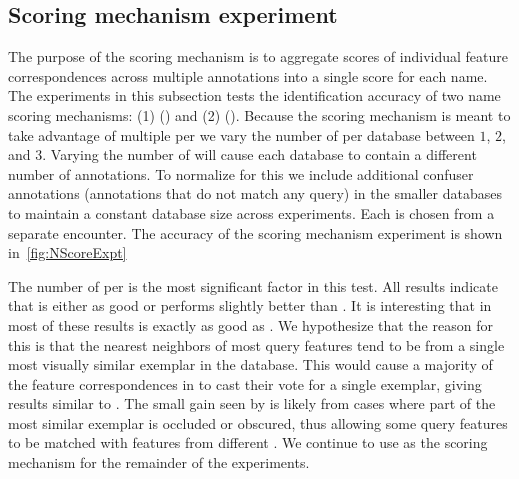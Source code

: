         \kptstype{}

    \subsection{Scoring mechanism experiment}\label{sub:exptscoremech}  


        The purpose of the scoring mechanism is to aggregate scores of individual feature correspondences across
          multiple annotations into a single score for each name.
        The experiments in this subsection tests the identification accuracy of two name scoring mechanisms:
        (1) \cscoring{} (\csum{}) and
        (2) \nscoring{} (\nsum{}).
        Because the scoring mechanism is meant to take advantage of multiple \exemplars{} per \name{} we vary the
          number of \exemplars{} per database \name{} between $1$, $2$, and $3$.
        Varying the number of \exemplars{} will cause each database to contain a different number of annotations.
        To normalize for this we include additional confuser annotations (annotations that do not match any
          query) in the smaller databases to maintain a constant database size across experiments.
        Each \exemplar{} is chosen from a separate encounter.
        The accuracy of the scoring mechanism experiment is shown in~\cref{fig:NScoreExpt}

        \NScoreExpt{}

        The number of \exemplars{} per \name{} is the most significant factor in this test.
        All results indicate that \nsum{} is either as good or performs slightly better than \csum{}.
        It is interesting that in most of these results \nsum{} is exactly as good as \csum{}.
        We hypothesize that the reason for this is that the nearest neighbors of most query features tend to be
          from a single most visually similar exemplar in the database.
        This would cause a majority of the feature correspondences in \nsum{} to cast their vote for a single
          exemplar, giving results similar to \csum{}.
        The small gain seen by \nsum{} is likely from cases where part of the most similar exemplar is occluded
          or obscured, thus allowing some query features to be matched with features from different \exemplars{}.
        We continue to use \nsum{} as the scoring mechanism for the remainder of the experiments.
        

